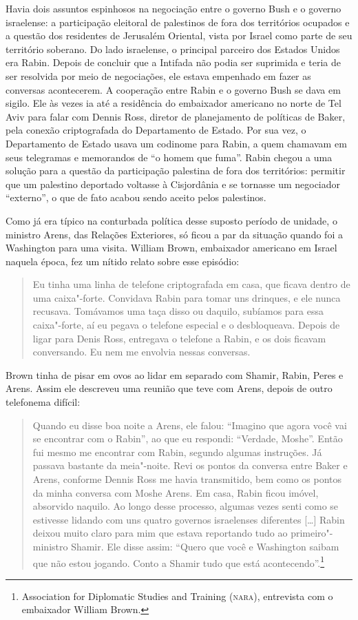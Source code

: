 Havia dois assuntos espinhosos na negociação entre o governo Bush e o
governo israelense: a participação eleitoral de palestinos de fora
dos territórios ocupados e a questão dos residentes de Jerusalém
Oriental, vista por Israel como parte de seu território soberano. Do
lado israelense, o principal parceiro dos Estados Unidos era Rabin.
Depois de concluir que a Intifada não podia ser suprimida e teria de
ser resolvida por meio de negociações, ele estava empenhado em fazer as
conversas acontecerem. A cooperação entre Rabin e o governo Bush se dava
em sigilo. Ele às vezes ia até a residência do embaixador americano no
norte de Tel Aviv para falar com Dennis Ross, diretor de planejamento
de políticas de Baker, pela conexão criptografada do Departamento de
Estado. Por sua vez, o Departamento de Estado usava um codinome para
Rabin, a quem chamavam em seus telegramas e memorandos de ``o homem que
fuma''. Rabin chegou a uma solução para a questão da participação
palestina de fora dos territórios: permitir que um palestino deportado
voltasse à Cisjordânia e se tornasse um negociador ``externo'', o que de
fato acabou sendo aceito pelos palestinos.

Como já era típico na conturbada política desse suposto período de
unidade, o ministro Arens, das Relações Exteriores, só ficou a par da
situação quando foi a Washington para uma visita. William Brown,
embaixador americano em Israel naquela época, fez um nítido relato sobre
esse episódio:

\begin{quote}
Eu tinha uma linha de telefone criptografada em casa, que ficava dentro
de uma caixa"-forte. Convidava Rabin para tomar uns drinques, e ele
nunca recusava. Tomávamos uma taça disso ou daquilo, subíamos para essa
caixa"-forte, aí eu pegava o telefone especial e o desbloqueava. Depois
de ligar para Denis Ross, entregava o telefone a Rabin, e os dois
ficavam conversando. Eu nem me envolvia nessas conversas.
\end{quote}

Brown tinha de pisar em ovos ao lidar em separado com Shamir, Rabin,
Peres e Arens. Assim ele descreveu uma reunião que teve com Arens,
depois de outro telefonema difícil:

\begin{quote}
Quando eu disse boa noite a Arens, ele falou: ``Imagino que agora você
vai se encontrar com o Rabin'', ao que eu respondi: ``Verdade, Moshe''.
Então fui mesmo me encontrar com Rabin, segundo algumas instruções. Já
passava bastante da meia"-noite. Revi os pontos da conversa entre Baker e
Arens, conforme Dennis Ross me havia transmitido, bem como os pontos da
minha conversa com Moshe Arens. Em casa, Rabin ficou imóvel, absorvido
naquilo. Ao longo desse processo, algumas vezes senti como se estivesse
lidando com uns quatro governos israelenses diferentes {[}\ldots{}{]} Rabin deixou
muito claro para mim que estava reportando tudo ao primeiro"-ministro
Shamir. Ele disse assim: ``Quero que você e Washington saibam que não
estou jogando. Conto a Shamir tudo que está acontecendo''.\footnote{Association
  for Diplomatic Studies and Training (\textsc{nara}), entrevista com o embaixador William Brown.}
\end{quote}

